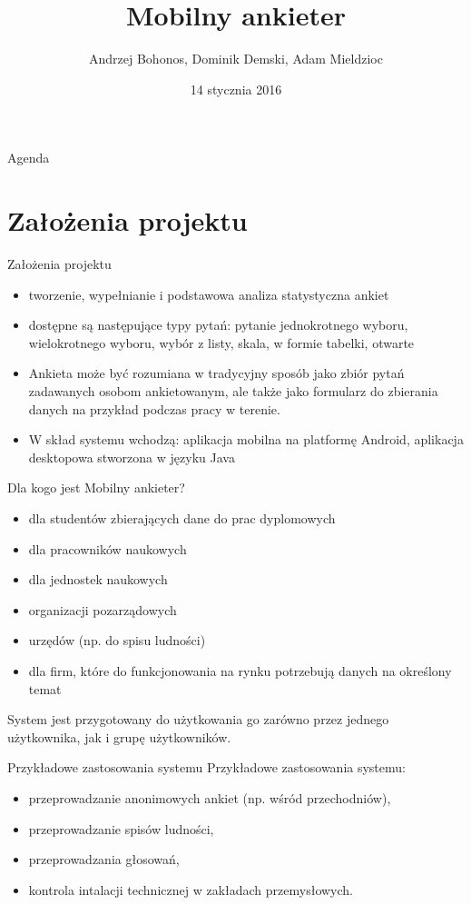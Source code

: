 \documentclass[a4paper,10pt]{beamer}
\date{14 stycznia 2016}
\title{Mobilny ankieter}
\author[A. Bohonos, D. Demski, A. Mieldzioc]{Andrzej Bohonos, Dominik Demski, Adam Mieldzioc}
\begin{document}
	
	\begin{frame}
		\titlepage
	\end{frame}
	\begin{frame}{Agenda}
		\tableofcontents
	\end{frame}
	
	\section{Założenia projektu}
	\begin{frame}{Założenia projektu}
		
		\begin{itemize}
			\item tworzenie, wypełnianie i podstawowa analiza statystyczna ankiet
			\item dostępne są następujące typy pytań: pytanie jednokrotnego wyboru, wielokrotnego wyboru, wybór z listy, skala, w formie tabelki, otwarte
			\item Ankieta może być rozumiana w tradycyjny sposób jako zbiór pytań zadawanych osobom ankietowanym, ale także jako formularz do zbierania danych na przykład podczas pracy w terenie. 
			\item W skład systemu wchodzą: aplikacja mobilna na platformę Android, aplikacja desktopowa stworzona w języku Java
		\end{itemize}
	\end{frame}
	\begin{frame}{Dla kogo jest Mobilny ankieter?}
		
		\begin{itemize}
			\item dla studentów zbierających dane do prac dyplomowych 
			\item dla pracowników naukowych
			\item  dla jednostek naukowych
			\item organizacji pozarządowych
			\item  urzędów (np. do spisu ludności)
			\item dla firm, które do funkcjonowania na rynku potrzebują danych na określony temat
		\end{itemize}
		System jest przygotowany do użytkowania go zarówno przez jednego użytkownika, jak i grupę użytkowników.
	\end{frame}
	
	
	\begin{frame}{Przykładowe zastosowania systemu}
		Przykładowe zastosowania systemu:
		\begin{itemize}
			\item przeprowadzanie anonimowych ankiet (np. wśród przechodniów),
			\item przeprowadzanie spisów ludności,
			\item przeprowadzania głosowań,
			\item kontrola intalacji technicznej w zakładach przemysłowych.
		\end{itemize}
	\end{frame}
	
\end{document}
